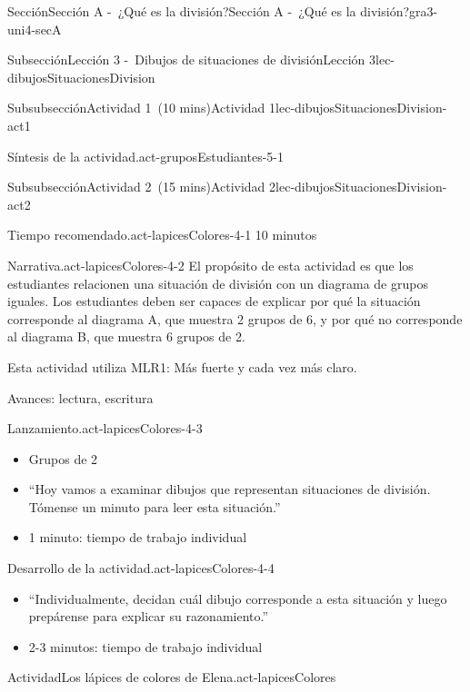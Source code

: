 \documentclass[oneside,10pt,]{article}
\begin{document}
\begin{sectionptx}{Sección}{Sección A -~¿Qué es la división?}{}{Sección A -~¿Qué es la división?}{}{}{gra3-uni4-secA}
\begin{subsectionptx}{Subsección}{Lección 3 -~Dibujos de situaciones de división}{}{Lección 3}{}{}{lec-dibujosSituacionesDivision}
\begin{subsubsectionptx}{Subsubsección}{Actividad 1~(10 mins)}{}{Actividad 1}{}{}{lec-dibujosSituacionesDivision-act1}
\begin{paragraphs}{Síntesis de la actividad.}{act-gruposEstudiantes-5-1}
\begin{itemize}[label=\textbullet]
\end{itemize}
\end{paragraphs}%
\end{subsubsectionptx}
%
%
\typeout{************************************************}
\typeout{************************************************}
%
\begin{subsubsectionptx}{Subsubsección}{Actividad 2~(15 mins)}{}{Actividad 2}{}{}{lec-dibujosSituacionesDivision-act2}
\par
\begin{paragraphs}{Tiempo recomendado.}{act-lapicesColores-4-1}%
10 minutos%
\end{paragraphs}%
\begin{paragraphs}{Narrativa.}{act-lapicesColores-4-2}%
El propósito de esta actividad es que los estudiantes relacionen una situación de división con un diagrama de grupos iguales. Los estudiantes deben ser capaces de explicar por qué la situación corresponde al diagrama A, que muestra 2 grupos de 6, y por qué no corresponde al diagrama B, que muestra 6 grupos de 2.%
\par
Esta actividad utiliza MLR1: Más fuerte y cada vez más claro.%
\par
Avances: lectura, escritura%
\end{paragraphs}%
\begin{paragraphs}{Lanzamiento.}{act-lapicesColores-4-3}%
%
\begin{itemize}[label=\textbullet]
\item{}Grupos de 2%
\item{}``Hoy vamos a examinar dibujos que representan situaciones de división. Tómense un minuto para leer esta situación.''%
\item{}1 minuto: tiempo de trabajo individual%
\end{itemize}
\end{paragraphs}%
\begin{paragraphs}{Desarrollo de la actividad.}{act-lapicesColores-4-4}%
%
\begin{itemize}[label=\textbullet]
\item{}``Individualmente, decidan cuál dibujo corresponde a esta situación y luego prepárense para explicar su razonamiento.''%
\item{}2-3 minutos: tiempo de trabajo individual%
\end{itemize}
\end{paragraphs}%
\begin{activity}{Actividad}{Los lápices de colores de Elena.}{act-lapicesColores}%

\end{activity}
\end{subsubsectionptx}
\end{subsectionptx}
\end{sectionptx}
\end{document}
